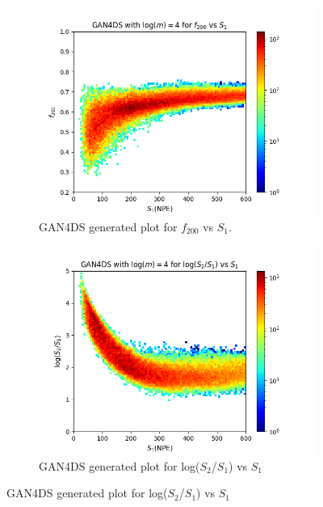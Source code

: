 \documentclass[11pt]{article} %
\begin{document}
\begin{figure}[H]
\begin{minipage}{\textwidth}
\end{minipage}
\begin{minipage}{\textwidth}
  \begin{subfigure}{.5\textwidth}
      \centering\captionsetup{width=.8\linewidth}%
      \includegraphics[scale=0.5]{./images/4/gan_f200_vs_s1.png}
      \caption{GAN4DS generated plot for $f_{200}$ vs $S_1$.}
  \end{subfigure}
  \begin{subfigure}{.5\textwidth}
      \centering\captionsetup{width=.8\linewidth}%
      \includegraphics[scale=0.5]{./images/4/gan_s1_over_s2_vs_s1.png}
      \caption{GAN4DS generated plot for log($S_2$/$S_1$) vs $S_1$}
  \end{subfigure}

\end{minipage}
\end{figure}
\end{document}
